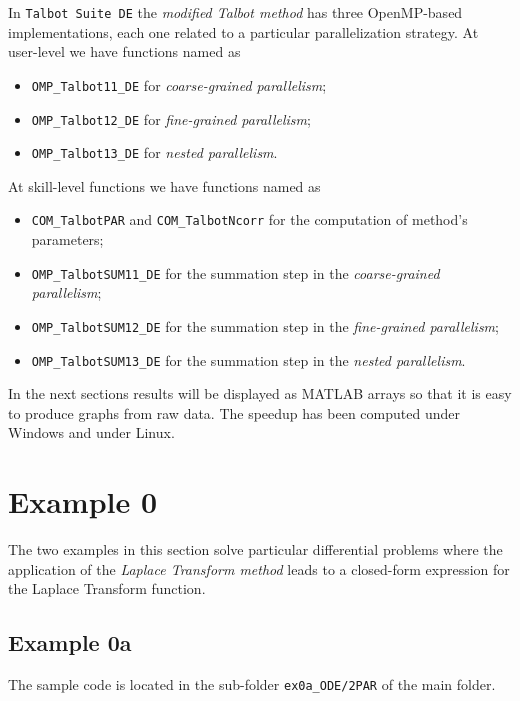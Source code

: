 \documentclass[a4paper,10pt]{report}%
\begin{document}
In {\tt Talbot Suite DE} the {\em modified Talbot method} has three OpenMP-based implementations, each one related to a particular parallelization strategy.
At user-level we have functions named as
\begin{itemize}
\item {\tt OMP\_Talbot11\_DE} for {\em coarse-grained parallelism};
\item {\tt OMP\_Talbot12\_DE} for {\em fine-grained parallelism};
\item {\tt OMP\_Talbot13\_DE} for {\em nested parallelism}.
\end{itemize}
At skill-level functions we have functions named as
\begin{itemize}
\item {\tt COM\_TalbotPAR} and {\tt COM\_TalbotNcorr} for the computation of method's parameters;
\item {\tt OMP\_TalbotSUM11\_DE} for the summation step in the {\em coarse-grained parallelism};
\item {\tt OMP\_TalbotSUM12\_DE} for the summation step in the {\em fine-grained parallelism};
\item {\tt OMP\_TalbotSUM13\_DE} for the summation step in the {\em nested parallelism}.
\end{itemize}
In the next sections results will be displayed as MATLAB arrays so that it is easy to produce
graphs from raw data. The speedup has been computed under Windows and under Linux.



\section{Example 0}
The two examples in this section solve particular differential problems where the application of the
{\em Laplace Transform method} leads to a closed-form expression for the Laplace Transform function.



\subsection{Example 0a}
The sample code is located in the sub-folder {\tt ex0a\_ODE/2PAR} of the main folder.
\end{document}
